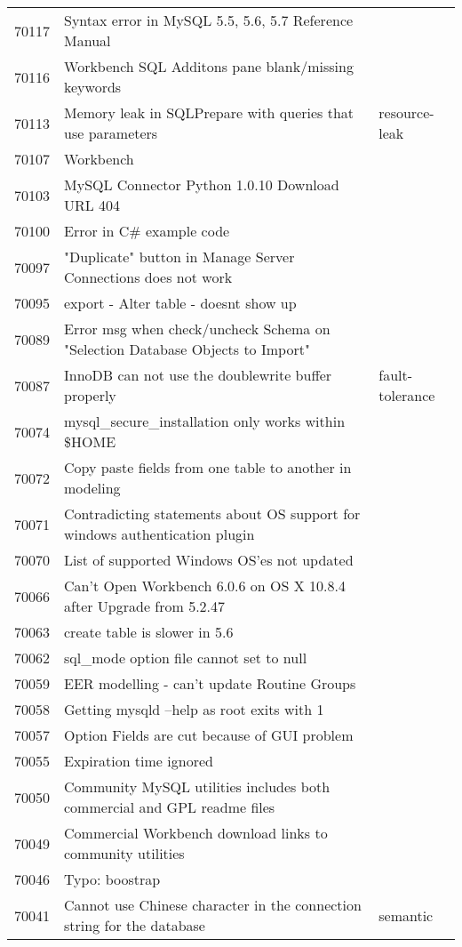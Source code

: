 \begin{longtable}[c]{p{1cm}p{10cm}p{1cm}}
70117 & Syntax error in MySQL 5.5, 5.6, 5.7 Reference Manual &  \\
70116 & Workbench SQL Additons pane blank/missing keywords &  \\
70113 & Memory leak in SQLPrepare with queries that use parameters & resource-leak \\
70107 & Workbench &  \\
70103 & MySQL Connector Python 1.0.10 Download URL 404 &  \\
70100 & Error in C\# example code &  \\
70097 & "Duplicate" button in Manage Server Connections does not work &  \\
70095 & export - Alter table - doesnt show up &  \\
70089 & Error msg when check/uncheck Schema on "Selection Database Objects to Import" &  \\
70087 & InnoDB can not use the doublewrite buffer properly & fault-tolerance \\
70074 & mysql\_secure\_installation only works within \$HOME &  \\
70072 & Copy paste fields from one table to another in modeling &  \\
70071 & Contradicting statements about OS support for windows authentication plugin &  \\
70070 & List of supported Windows OS'es not updated &  \\
70066 & Can't Open Workbench 6.0.6 on OS X 10.8.4 after Upgrade from 5.2.47 &  \\
70063 & create table is slower in 5.6 &  \\
70062 & sql\_mode option file cannot set to null &  \\
70059 & EER modelling - can't update Routine Groups &  \\
70058 & Getting mysqld --help as root exits with 1 &  \\
70057 & Option Fields are cut because of GUI problem &  \\
70055 & Expiration time ignored &  \\
70050 & Community MySQL utilities includes both commercial and GPL readme files &  \\
70049 & Commercial Workbench download links to community utilities &  \\
70046 & Typo: boostrap &  \\
70041 & Cannot use Chinese character in the connection string for the database & semantic \\

\end{longtable}
